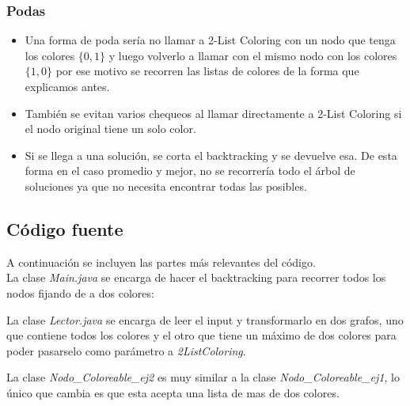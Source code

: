 


\subsubsection{Podas}

\begin{itemize}
	\item Una forma de poda sería no llamar a 2-List Coloring con un nodo que tenga los colores $\{0, 1\}$ y luego volverlo a llamar con el mismo nodo con los colores $\{1, 0\}$ por ese motivo se recorren las listas de colores de la forma que explicamos antes.
	\item También se evitan varios chequeos al llamar directamente a 2-List Coloring si el nodo original tiene un solo color.
	\item Si se llega a una solución, se corta el backtracking y se devuelve esa. De esta forma en el caso promedio y mejor, no se recorrería todo el árbol de soluciones ya que no necesita encontrar todas las posibles.
\end{itemize}


\subsection{Código fuente}

A continuación se incluyen las partes más relevantes del código.\\
La clase \emph{Main.java} se encarga de hacer el backtracking para recorrer todos los nodos fijando de a dos colores:

La clase \emph{Lector.java} se encarga de leer el input y transformarlo en dos grafos, uno que contiene todos los colores y el otro que tiene un máximo de dos colores para poder pasarselo como parámetro a \emph{2ListColoring}.

La clase \emph{Nodo_Coloreable_ej2} es muy similar a la clase \emph{Nodo_Coloreable_ej1}, lo único que cambia es que esta acepta una lista de mas de dos colores.

